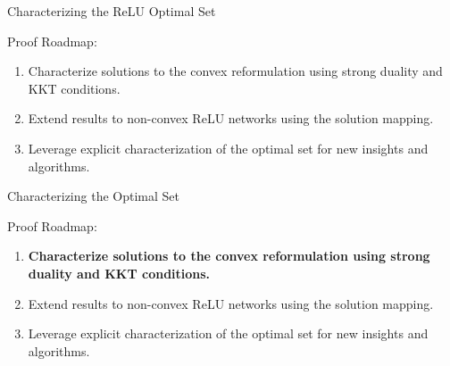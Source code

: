 \documentclass[usenames,dvipsnames,mathserif,notheorems]{beamer}
\newcommand{\bad}[1]{\textcolor{bad}{#1}}
\newcommand{\good}[1]{\textcolor{good}{#1}}
\begin{document}
\begin{frame}{Characterizing the ReLU Optimal Set}

	{
		\large
		{\Large
			Proof Roadmap:
		}
		\vspace{2em}
		\begin{enumerate}
			\large
			\item \pause
			      Characterize solutions to the \good{convex reformulation}
			      using strong duality and KKT conditions.
			      \vspace{1ex}
			      \pause
			\item Extend results to \bad{non-convex} ReLU networks
			      using the solution mapping.
			      \vspace{1ex}
			      \pause
			\item Leverage explicit characterization of the optimal
			      set for \good{new insights and algorithms}.
		\end{enumerate}
	}


\end{frame}

\begin{frame}{Characterizing the Optimal Set}

	{
		\large
		{\Large
			Proof Roadmap:
		}
		\vspace{2em}
		\begin{enumerate}
			\large
			\item \textbf{Characterize solutions to the \good{convex reformulation}
				      using strong duality and KKT conditions.}
			      \vspace{1ex}
			\item Extend results to \bad{non-convex} ReLU networks
			      using the solution mapping.
			      \vspace{1ex}
			\item Leverage explicit characterization of the optimal
			      set for \good{new insights and algorithms}.
		\end{enumerate}
	}

\end{frame}
\end{document}
